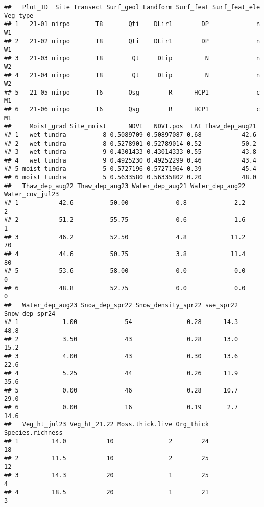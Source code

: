 \documentclass[
]{article}
\begin{document}
\begin{verbatim}
##   Plot_ID  Site Transect Surf_geol Landform Surf_feat Surf_feat_ele Veg_type
## 1   21-01 nirpo       T8       Qti    DLir1        DP             n       W1
## 2   21-02 nirpo       T8       Qti    DLir1        DP             n       W1
## 3   21-03 nirpo       T8        Qt     DLip         N             n       W2
## 4   21-04 nirpo       T8        Qt     DLip         N             n       W2
## 5   21-05 nirpo       T6       Qsg        R      HCP1             c       M1
## 6   21-06 nirpo       T6       Qsg        R      HCP1             c       M1
##     Moist_grad Site_moist      NDVI   NDVI.pos  LAI Thaw_dep_aug21
## 1   wet tundra          8 0.5089709 0.50897087 0.68           42.6
## 2   wet tundra          8 0.5278901 0.52789014 0.52           50.2
## 3   wet tundra          9 0.4301433 0.43014333 0.55           43.8
## 4   wet tundra          9 0.4925230 0.49252299 0.46           43.4
## 5 moist tundra          5 0.5727196 0.57271964 0.39           45.4
## 6 moist tundra          5 0.5633580 0.56335802 0.20           48.0
##   Thaw_dep_aug22 Thaw_dep_aug23 Water_dep_aug21 Water_dep_aug22 Water_cov_jul23
## 1           42.6          50.00             0.8             2.2               2
## 2           51.2          55.75             0.6             1.6               1
## 3           46.2          52.50             4.8            11.2              70
## 4           44.6          50.75             3.8            11.4              80
## 5           53.6          58.00             0.0             0.0               0
## 6           48.8          52.75             0.0             0.0               0
##   Water_dep_aug23 Snow_dep_spr22 Snow_density_spr22 swe_spr22 Snow_dep_spr24
## 1            1.00             54               0.28      14.3           48.8
## 2            3.50             43               0.28      13.0           15.2
## 3            4.00             43               0.30      13.6           22.6
## 4            5.25             44               0.26      11.9           35.6
## 5            0.00             46               0.28      10.7           29.0
## 6            0.00             16               0.19       2.7           14.6
##   Veg_ht_jul23 Veg_ht_21.22 Moss.thick.live Org_thick Species.richness
## 1         14.0           10               2        24               18
## 2         11.5           10               2        25               12
## 3         14.3           20               1        25                4
## 4         18.5           20               1        21                3

\end{verbatim}
\end{document}

